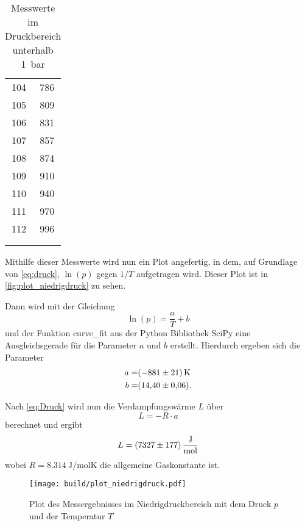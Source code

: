 \begin{table}
\begin{tabular}{S[table-format=3.0] S[table-format=3.0]}
        104 & 786 \\
        105 & 809 \\
        106 & 831 \\
        107 & 857 \\
        108 & 874 \\
        109 & 910 \\
        110 & 940 \\
        111 & 970 \\
        112 & 996 \\
        & \\
        & \\
        \bottomrule
    \end{tabular}
    \caption{Messwerte im Druckbereich unterhalb \SI{1}{bar}}
    \label{tab:niedrigdruck_messwerte}
\end{table}

Mithilfe dieser Messwerte wird nun ein Plot angefertig, in dem, auf Grundlage von \autoref{eq:druck}, $\ln(p)$ gegen $1/T$ aufgetragen wird.
Dieser Plot ist in \autoref{fig:plot_niedrigdruck} zu sehen.

Dann wird mit der Gleichung
\begin{equation}
    \ln(p) = \frac{a}{T} + b
\end{equation}
und der Funktion curve\_fit aus der Python Bibliothek SciPy eine Ausgleichsgerade für die Parameter $a$ und $b$ erstellt.\cite{scipy} Hierdurch ergeben sich die Parameter
\begin{align*}
    a =& \SI{-881+-21}{\kelvin} \\
    b =& \SI{14.40+-0.06}{}.
    \label{eq:niedrigdruck_parameter}
\end{align*}

Nach \autoref{eq:Druck} wird nun die Verdampfungswärme $L$ über
\begin{equation}
    L = -R \cdot a
\end{equation}
berechnet und ergibt
\begin{equation*}
    L = \SI{7327+-177}{\joule\per\mol}
\end{equation*}
wobei $R=\SI{8.314}{\joule\per\mol\kelvin}$ die allgemeine Gaskonstante ist.\cite{physics_constants}

\begin{figure}
    \centering
    \texttt{[image: build/plot\_niedrigdruck.pdf]}
    \caption{Plot des Messergebnisses im Niedrigdruckbereich mit dem Druck $p$ und der Temperatur $T$}
    \label{fig:plot_niedrigdruck}
\end{figure}

